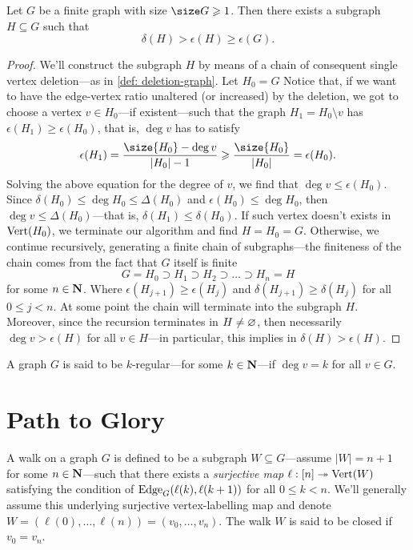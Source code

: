 \begin{proposition}\label{prop: edge-dense-subgraph}
Let \(G\) be a finite graph with size \(\size G \geq 1\). Then there exists a
subgraph \(H \subseteq G\) such that
\[
  \delta(H) > \epsilon(H) \geq \epsilon(G).
\]
\end{proposition}

\begin{proof}
We'll construct the subgraph \(H\) by means of a chain of consequent single
vertex deletion---as in \cref{def: deletion-graph}. Let \(H_0 = G\) Notice that,
if we want to have the edge-vertex ratio unaltered (or increased) by the
deletion, we got to choose a vertex \(v \in H_0\)---if existent---such that the
graph \(H_1 = H_0 \setminus v\) has \(\epsilon(H_1) \geq \epsilon(H_0)\), that is, \(\deg v\) has to
satisfy
\[
  \epsilon(H_1) = \frac{\size{H_0} - \deg v}{|H_0| - 1}
  \geq \frac{\size{H_0}}{|H_0|} = \epsilon(H_0).
\]
Solving the above equation for the degree of \(v\), we find that
\(\deg v \leq \epsilon(H_0)\). Since
\(\delta(H_0) \leq \deg H_0 \leq \Delta(H_0)\) and
\(\epsilon(H_0) \leq \deg H_0\), then \(\deg v \leq \Delta(H_0)\)---that is,
\(\delta(H_1) \leq \delta(H_0)\). If such vertex doesn't exists in
\(\operatorname{Vert}(H_0)\), we terminate our algorithm and find \(H = H_0 =
G\). Otherwise, we continue recursively, generating a finite chain of
subgraphs---the finiteness of the chain comes from the fact that \(G\) itself is
finite
\[
  G = H_0 \supset H_1 \supset H_2 \supset \dots \supset H_n = H
\]
for some \(n \in \mathbf{N}\). Where \(\epsilon(H_{j+1}) \geq \epsilon(H_j)\) and \(\delta(H_{j+1}) \geq \delta(H_j)\)
for all \(0 \leq j < n\). At some point the chain will terminate into the subgraph
\(H\). Moreover, since the recursion terminates in \(H \neq \varnothing\), then
necessarily \(\deg v > \epsilon(H)\) for all \(v \in H\)---in particular, this implies in
\(\delta(H) > \epsilon(H)\).
\end{proof}

\begin{definition}\label{def: k-regular}
A graph \(G\) is said to be \(k\)-regular---for some \(k \in \mathbf{N}\)---if
\(\deg v = k\) for all \(v \in G\).
\end{definition}

\section{Path to Glory}

\begin{definition}[Walk]\label{def: walk}
A walk on a graph \(G\) is defined to be a subgraph \(W \subseteq G\)---assume \(|W| = n
+ 1\) for some \(n \in \mathbf{N}\)---such that there exists a \emph{surjective map} \(\ell:
[n] \twoheadrightarrow \operatorname{Vert}(W)\) satisfying the condition of \(\operatorname{Edge}_G(\ell(k), \ell(k + 1))\) for all \(0
\leq k < n\). We'll generally assume this underlying surjective vertex-labelling
map and denote \(W = (\ell(0), \dots, \ell(n)) = (v_0, \dots, v_n)\). The walk \(W\)
is said to be closed if \(v_0 = v_n\).
\end{definition}

